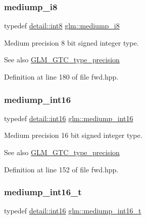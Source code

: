 \subsubsection{\texorpdfstring{mediump\_i8}{mediump\_i8}}
{\footnotesize\ttfamily typedef \mbox{\hyperlink{namespaceglm_1_1detail_a04b526a8d7a9b455602a0afa78c531e0}{detail\+::int8}} \mbox{\hyperlink{group__gtc__type__precision_ga28a8b5fd51072680bb55178c17cc7411}{glm\+::mediump\+\_\+i8}}}

Medium precision 8 bit signed integer type. \begin{DoxySeeAlso}{See also}
\mbox{\hyperlink{group__gtc__type__precision}{G\+L\+M\+\_\+\+G\+T\+C\+\_\+type\+\_\+precision}} 
\end{DoxySeeAlso}


Definition at line 180 of file fwd.\+hpp.

\mbox{\label{group__gtc__type__precision_ga4611997edb6c61606daa11990cf08798}} 
\subsubsection{\texorpdfstring{mediump\_int16}{mediump\_int16}}
{\footnotesize\ttfamily typedef \mbox{\hyperlink{namespaceglm_1_1detail_a375938874ca4f0a0982ec6373b56117b}{detail\+::int16}} \mbox{\hyperlink{group__gtc__type__precision_ga4611997edb6c61606daa11990cf08798}{glm\+::mediump\+\_\+int16}}}

Medium precision 16 bit signed integer type. \begin{DoxySeeAlso}{See also}
\mbox{\hyperlink{group__gtc__type__precision}{G\+L\+M\+\_\+\+G\+T\+C\+\_\+type\+\_\+precision}} 
\end{DoxySeeAlso}


Definition at line 152 of file fwd.\+hpp.

\mbox{\label{group__gtc__type__precision_ga478fab608cf43040013d719a3e03b194}} 
\subsubsection{\texorpdfstring{mediump\_int16\_t}{mediump\_int16\_t}}
{\footnotesize\ttfamily typedef \mbox{\hyperlink{namespaceglm_1_1detail_a375938874ca4f0a0982ec6373b56117b}{detail\+::int16}} \mbox{\hyperlink{group__gtc__type__precision_ga478fab608cf43040013d719a3e03b194}{glm\+::mediump\+\_\+int16\+\_\+t}}}

